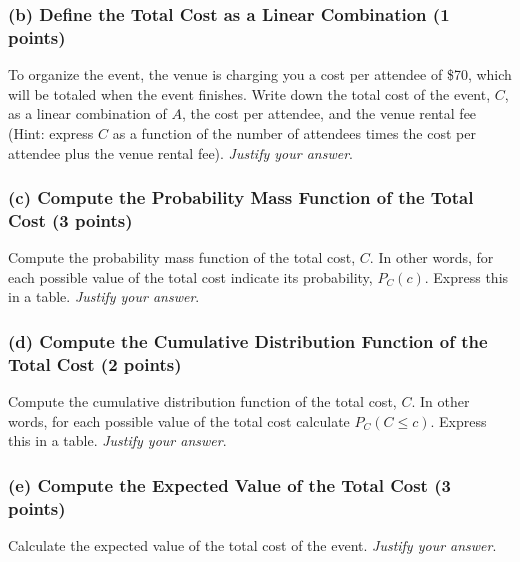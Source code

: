 \documentclass{article}
\begin{document}
\subsubsection*{(b) Define the Total Cost as a Linear Combination (1 points)}
To organize the event, the venue is charging you a cost per attendee of \$70, which will be totaled when the event finishes. Write down the total cost of the event, $C$, as a linear combination of $A$, the cost per attendee, and the venue rental fee (Hint: express $C$ as a function of the number of attendees times the cost per attendee plus the venue rental fee). \emph{Justify your answer}.

\begin{center}
 \end{center}

\subsubsection*{(c) Compute the Probability Mass Function of the Total Cost (3 points)}
Compute the probability mass function of the total cost, $C$. In other words, for each possible value of the total cost indicate its probability, $P_C(c)$. Express this in a table. \emph{Justify your answer}.

\begin{center}
\end{center}

\subsubsection*{(d) Compute the Cumulative Distribution Function of the Total Cost (2 points)}
Compute the cumulative distribution function of the total cost, $C$. In other words, for each possible value of the total cost calculate $P_C(C\leq c)$. Express this in a table. \emph{Justify your answer}.

\begin{center}
\end{center}

\subsubsection*{(e) Compute the Expected Value of the Total Cost (3 points)}
Calculate the expected value of the total cost of the event. \emph{Justify your answer}.
\end{document}
